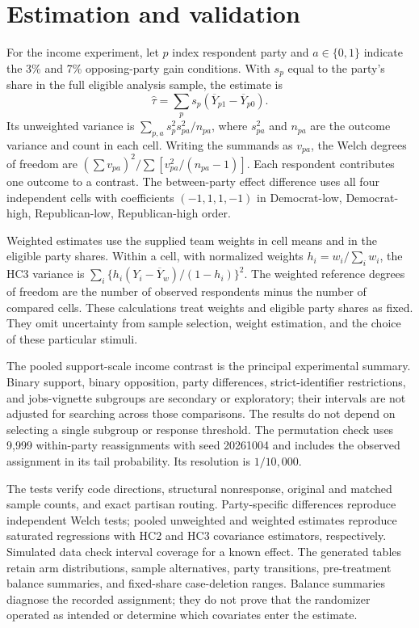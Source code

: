 \documentclass[11pt]{article}
\begin{document}
\section{Estimation and validation}
For the income experiment, let $p$ index respondent party and $a\in\{0,1\}$ indicate the 3\% and 7\% opposing-party gain conditions. With $s_p$ equal to the party's share in the full eligible analysis sample, the estimate is
\[
\widehat\tau=\sum_p s_p(\overline Y_{p1}-\overline Y_{p0}).
\]
Its unweighted variance is $\sum_{p,a}s_p^2s_{pa}^2/n_{pa}$, where $s_{pa}^2$ and $n_{pa}$ are the outcome variance and count in each cell. Writing the summands as $v_{pa}$, the Welch degrees of freedom are $(\sum v_{pa})^2/\sum[v_{pa}^2/(n_{pa}-1)]$. Each respondent contributes one outcome to a contrast. The between-party effect difference uses all four independent cells with coefficients $(-1,1,1,-1)$ in Democrat-low, Democrat-high, Republican-low, Republican-high order.

Weighted estimates use the supplied team weights in cell means and in the eligible party shares. Within a cell, with normalized weights $h_i=w_i/\sum_iw_i$, the HC3 variance is $\sum_i\{h_i(Y_i-\overline Y_w)/(1-h_i)\}^2$. The weighted reference degrees of freedom are the number of observed respondents minus the number of compared cells. These calculations treat weights and eligible party shares as fixed. They omit uncertainty from sample selection, weight estimation, and the choice of these particular stimuli.

The pooled support-scale income contrast is the principal experimental summary. Binary support, binary opposition, party differences, strict-identifier restrictions, and jobs-vignette subgroups are secondary or exploratory; their intervals are not adjusted for searching across those comparisons. The results do not depend on selecting a single subgroup or response threshold. The permutation check uses 9,999 within-party reassignments with seed 20261004 and includes the observed assignment in its tail probability. Its resolution is $1/10{,}000$.

The tests verify code directions, structural nonresponse, original and matched sample counts, and exact partisan routing. Party-specific differences reproduce independent Welch tests; pooled unweighted and weighted estimates reproduce saturated regressions with HC2 and HC3 covariance estimators, respectively. Simulated data check interval coverage for a known effect. The generated tables retain arm distributions, sample alternatives, party transitions, pre-treatment balance summaries, and fixed-share case-deletion ranges. Balance summaries diagnose the recorded assignment; they do not prove that the randomizer operated as intended or determine which covariates enter the estimate.
\end{document}
